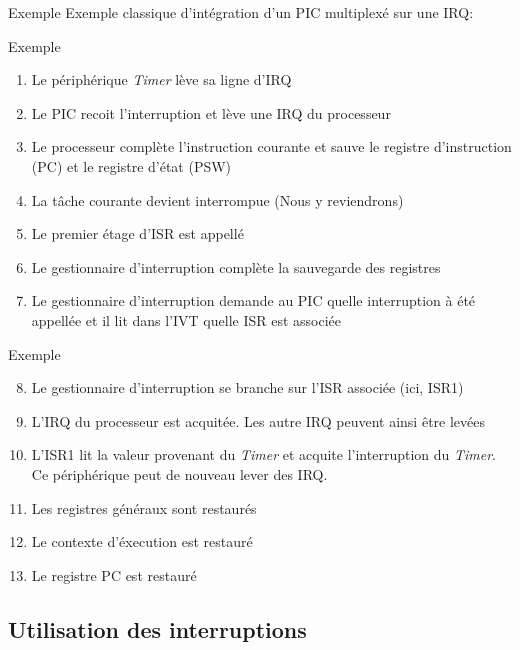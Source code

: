 \begin{frame}{Exemple}
  Exemple classique d'intégration d'un PIC multiplexé sur une IRQ:
  \begin{center}
  \end{center}
\end{frame}

\begin{frame}{Exemple}
  \begin{enumerate}
  \item Le périphérique \emph{Timer} lève sa ligne d'IRQ
  \item Le PIC recoit l'interruption et lève une IRQ du processeur
  \item  Le processeur  complète  l'instruction courante  et sauve  le
    registre d'instruction (PC) et le registre d'état (PSW)
  \item La tâche courante devient interrompue (Nous y reviendrons)
  \item Le premier étage d'ISR est appellé
  \item  Le  gestionnaire d'interruption  complète  la sauvegarde  des
    registres
  \item   Le  gestionnaire  d'interruption   demande  au   PIC  quelle
    interruption à  été appellée et il  lit dans l'IVT  quelle ISR est
    associée
  \end{enumerate}
\end{frame}

\begin{frame}{Exemple}
  \begin{enumerate}
    \setcounter{enumi}{7}
  \item Le  gestionnaire d'interruption se branche  sur l'ISR associée
    (ici, ISR1)
  \item L'IRQ du processeur est  acquitée. Les autre IRQ peuvent ainsi
    être levées
  \item L'ISR1 lit la  valeur provenant du \emph{Timer} et acquite
    l'interruption  du \emph{Timer}. Ce  périphérique peut  de nouveau
    lever des IRQ.
  \item Les registres généraux sont restaurés
  \item Le contexte d'éxecution est restauré
  \item Le registre PC est restauré
  \end{enumerate}
\end{frame}

\subsection{Utilisation des interruptions}

